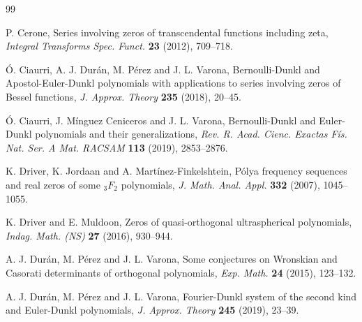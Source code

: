 \documentclass[10pt,a4paper]{article}
\numberwithin{equation}{section}
\theoremstyle{plain}
\theoremstyle{definition}
\begin{document}




\begin{thebibliography}{99}


P. Cerone,
Series involving zeros of transcendental functions including zeta,
\textit{Integral Transforms Spec. Funct.} \textbf{23} (2012), 709--718.

\'O. Ciaurri, A. J. Dur\'an, M. P\'erez and J. L. Varona,
Bernoulli-Dunkl and Apostol-Euler-Dunkl polynomials with applications to series involving
zeros of Bessel functions,
\textit{J. Approx. Theory}
\textbf{235} (2018), 20--45.

\'O. Ciaurri, J. M\'inguez Ceniceros and J. L. Varona,
Bernoulli-Dunkl and Euler-Dunkl polynomials and their generalizations,
\textit{Rev. R. Acad. Cienc. Exactas F\'is. Nat. Ser. A Mat. RACSAM} 
\textbf{113} (2019), 2853--2876.

K. Driver, K. Jordaan and A. Mart\'inez-Finkelshtein,
P\'olya frequency sequences and real zeros of some ${}_3F_2$ polynomials,
\textit{J. Math. Anal. Appl.}
\textbf{332} (2007), 1045--1055.

K. Driver and E. Muldoon,
Zeros of quasi-orthogonal ultraspherical polynomials,
\textit{Indag. Math. (NS)} \textbf{27} (2016), 930--944.

A. J. Dur\'an, M. P\'erez and J. L. Varona,
Some conjectures on Wronskian and Casorati determinants of orthogonal polynomials,
\textit{Exp. Math.}
\textbf{24} (2015), 123--132.

A. J. Dur\'an, M. P\'erez and J. L. Varona,
Fourier-Dunkl system of the second kind and Euler-Dunkl polynomials,
\textit{J. Approx. Theory}
\textbf{245} (2019), 23--39.


\end{thebibliography}
\end{document}

